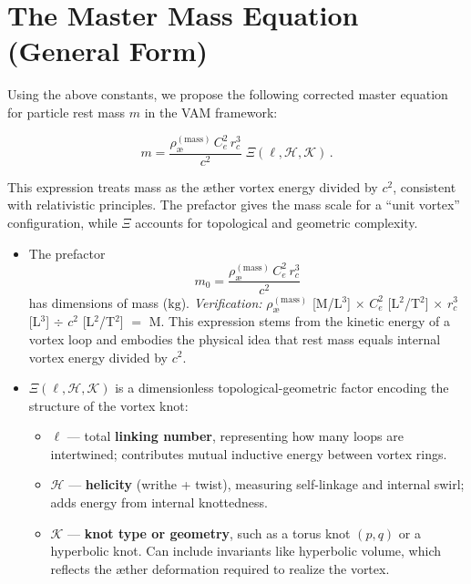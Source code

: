     \bigskip

\section{The Master Mass Equation (General Form)}

Using the above constants, we propose the following corrected master equation for particle rest mass $m$ in the VAM framework:

\[
    \boxed{
        m = \frac{\rho_{\text{\ae}}^{(\mathrm{mass})} \, C_e^2 \, r_c^3}{c^2} \; \Xi(\ell, \mathcal{H}, \mathcal{K}) \,.
    }
\]

This expression treats mass as the æther vortex energy divided by $c^2$, consistent with relativistic principles. The prefactor gives the mass scale for a “unit vortex” configuration, while $\Xi$ accounts for topological and geometric complexity.

\begin{itemize}
    \item The prefactor
    \[
        m_0 = \frac{\rho_{\text{\ae}}^{(\mathrm{mass})} \, C_e^2 \, r_c^3}{c^2}
    \]
    has dimensions of mass ($\mathrm{kg}$). \textit{Verification:} $\rho_{\text{\ae}}^{(\mathrm{mass})}$ [M/L$^3$] $\times$ $C_e^2$ [L$^2$/T$^2$] $\times$ $r_c^3$ [L$^3$] $\div$ $c^2$ [L$^2$/T$^2$] $=$ M. This expression stems from the kinetic energy of a vortex loop and embodies the physical idea that rest mass equals internal vortex energy divided by $c^2$.

    \item $\Xi(\ell,\mathcal{H},\mathcal{K})$ is a dimensionless topological-geometric factor encoding the structure of the vortex knot:
    \begin{itemize}
        \item $\ell$ — total \textbf{linking number}, representing how many loops are intertwined; contributes mutual inductive energy between vortex rings.

        \item $\mathcal{H}$ — \textbf{helicity} (writhe + twist), measuring self-linkage and internal swirl; adds energy from internal knottedness.

        \item $\mathcal{K}$ — \textbf{knot type or geometry}, such as a torus knot $(p,q)$ or a hyperbolic knot. Can include invariants like hyperbolic volume, which reflects the æther deformation required to realize the vortex.
    \end{itemize}
\end{itemize}

